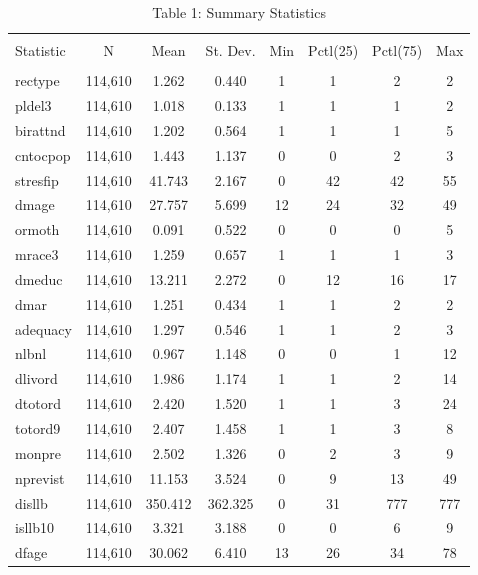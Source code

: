 

\begin{longtable}{@{\extracolsep{5pt}}lccccccc}
\caption{Table 1: Summary Statistics} 
  \label{}  
\\[-1.8ex]\hline 
\hline \\[-1.8ex] 
Statistic & \multicolumn{1}{c}{N} & \multicolumn{1}{c}{Mean} & \multicolumn{1}{c}{St. Dev.} & \multicolumn{1}{c}{Min} & \multicolumn{1}{c}{Pctl(25)} & \multicolumn{1}{c}{Pctl(75)} & \multicolumn{1}{c}{Max} \\ 
\hline \\[-1.8ex] 
rectype & 114,610 & 1.262 & 0.440 & 1 & 1 & 2 & 2 \\ 
pldel3 & 114,610 & 1.018 & 0.133 & 1 & 1 & 1 & 2 \\ 
birattnd & 114,610 & 1.202 & 0.564 & 1 & 1 & 1 & 5 \\ 
cntocpop & 114,610 & 1.443 & 1.137 & 0 & 0 & 2 & 3 \\ 
stresfip & 114,610 & 41.743 & 2.167 & 0 & 42 & 42 & 55 \\ 
dmage & 114,610 & 27.757 & 5.699 & 12 & 24 & 32 & 49 \\ 
ormoth & 114,610 & 0.091 & 0.522 & 0 & 0 & 0 & 5 \\ 
mrace3 & 114,610 & 1.259 & 0.657 & 1 & 1 & 1 & 3 \\ 
dmeduc & 114,610 & 13.211 & 2.272 & 0 & 12 & 16 & 17 \\ 
dmar & 114,610 & 1.251 & 0.434 & 1 & 1 & 2 & 2 \\ 
adequacy & 114,610 & 1.297 & 0.546 & 1 & 1 & 2 & 3 \\ 
nlbnl & 114,610 & 0.967 & 1.148 & 0 & 0 & 1 & 12 \\ 
dlivord & 114,610 & 1.986 & 1.174 & 1 & 1 & 2 & 14 \\ 
dtotord & 114,610 & 2.420 & 1.520 & 1 & 1 & 3 & 24 \\ 
totord9 & 114,610 & 2.407 & 1.458 & 1 & 1 & 3 & 8 \\ 
monpre & 114,610 & 2.502 & 1.326 & 0 & 2 & 3 & 9 \\ 
nprevist & 114,610 & 11.153 & 3.524 & 0 & 9 & 13 & 49 \\ 
disllb & 114,610 & 350.412 & 362.325 & 0 & 31 & 777 & 777 \\ 
isllb10 & 114,610 & 3.321 & 3.188 & 0 & 0 & 6 & 9 \\ 
dfage & 114,610 & 30.062 & 6.410 & 13 & 26 & 34 & 78 \\ 

\end{longtable}
